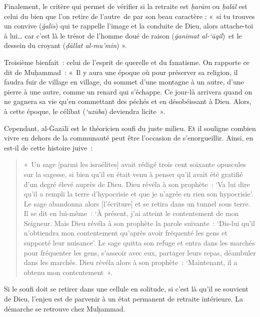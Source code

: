 Finalement, le critère qui permet de vérifier si la retraite est
\emph{ḥarām} ou \emph{ḥalāl} est celui du bien que l'on retire de
l'autre~de par son beau caractère : «~si tu trouves un convive
(\emph{ğalīs}) qui te rappelle l'image et la conduite de Dieu, alors
attache-toi à lui\ldots{} car c'est là le trésor de l'homme doué de
raison (\emph{ġanīmat al-`āqil})~et le dessein du croyant (\emph{ḍāllat
al-mu'min}) ».

Troisième bienfait~: celui de l'esprit de querelle et du fanatisme. On
rapporte ce dit de Muḥammad~: «~Il y aura une époque où pour préserver
sa religion, il faudra fuir de village en village, du sommet d'une
montagne à un autre, d'une pierre à une autre, comme un renard qui
s'échappe. Ce jour-là arrivera quand on ne gagnera sa vie qu'en
commettant des péchés et en désobéissant à Dieu. Alors, à cette époque,
le célibat (\emph{`uzūba}) deviendra licite~».

Cependant, al-Ġazālī est le théoricien soufi du juste milieu. Et il
souligne combien vivre en dehors de la communauté peut être l'occasion
de s'enorgueillir. Ainsi, en est-il de cette histoire juive~:

\begin{quote}
«~Un sage {[}parmi les israélites{]} avait rédigé trois cent soixante
opuscules sur la sagesse, si bien qu'il en était venu à penser qu'il
avait été gratifié d'un degré élevé auprès de Dieu. Dieu révéla à son
prophète~: `Va lui dire qu'il a rempli la terre d'hypocrisie et que je
n'agrée en rien son hypocrisie'. Le sage abandonna alors
{[}l'écriture{]} et se retira dans un tunnel sous terre. Il se dit en
lui-même~: `À présent, j'ai atteint le contentement de mon Seigneur.
Mais Dieu révéla à son prophète la parole suivante~: `Dis-lui qu'il
n'obtiendra mon contentement qu'après avoir fréquenté les gens et
supporté leur nuisance'. Le sage quitta son refuge et entra dans les
marchés pour fréquenter les gens, s'asseoir avec eux, partager leurs
repas, déambuler dans les marchés. Dieu révéla alors à son prophète~:
`Maintenant, il a obtenu mon contentement~».
\end{quote}

Si le soufi doit se retirer dans une cellule en solitude, si c'est là
qu'il se souvient de Dieu, l'enjeu est de parvenir à un état permanent
de retraite intérieure. La démarche se retrouve chez Muḥammad.

